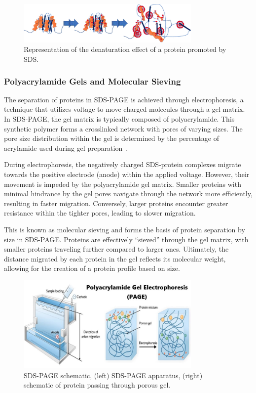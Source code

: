 \begin{figure}[H]
    \centering
    \includegraphics[width=0.8\textwidth]{./media/images/sds_effect}
    \caption{Representation of the denaturation effect of a protein promoted by SDS.}
    \label{fig:sds_effect}
\end{figure}

\subsubsection{Polyacrylamide Gels and Molecular Sieving}

The separation of proteins in SDS-PAGE is achieved through electrophoresis, a technique
that utilizes voltage to move charged molecules through a gel matrix. In SDS-PAGE, the
gel matrix is typically composed of polyacrylamide. This synthetic polymer forms a crosslinked network with pores of varying sizes. The pore size distribution within the gel is
determined by the percentage of acrylamide used during gel preparation~\cite{sdsgelsieving}.

During electrophoresis, the negatively charged SDS-protein complexes migrate towards
the positive electrode (anode) within the applied voltage. However, their movement is
impeded by the polyacrylamide gel matrix. Smaller proteins with minimal hindrance by
the gel pores navigate through the network more efficiently, resulting in faster migration.
Conversely, larger proteins encounter greater resistance within the tighter pores, leading
to slower migration.

This is known as molecular sieving and forms the basis of protein separation by size in
SDS-PAGE. Proteins are effectively ``sieved'' through the gel matrix, with smaller proteins
traveling further compared to larger ones. Ultimately, the distance migrated by each
protein in the gel reflects its molecular weight, allowing for the creation of a protein
profile based on size.

\begin{figure}[H]
    \centering
    \includegraphics[width=0.8\textwidth]{./media/images/sds_schematic}
    \caption{SDS-PAGE schematic, (left) SDS-PAGE apparatus, (right) schematic of protein passing through porous gel.}
    \label{fig:sds_schematic}
\end{figure}

